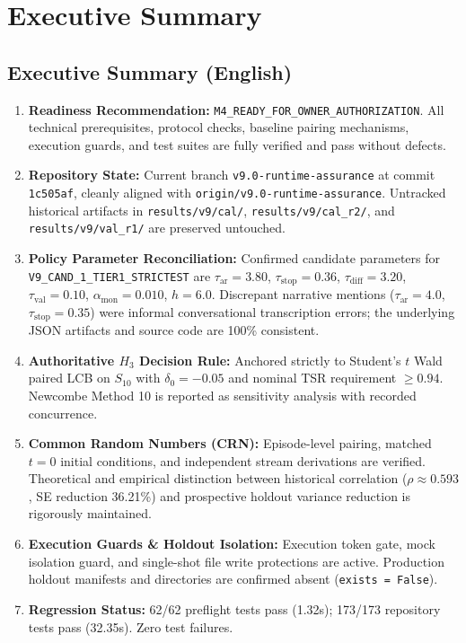 \documentclass[10pt,a4paper]{article}
\begin{document}
\section{Executive Summary}

\subsection{Executive Summary (English)}
\begin{enumerate}
    \item \textbf{Readiness Recommendation:} \texttt{M4\_READY\_FOR\_OWNER\_AUTHORIZATION}. All technical prerequisites, protocol checks, baseline pairing mechanisms, execution guards, and test suites are fully verified and pass without defects.
    \item \textbf{Repository State:} Current branch \texttt{v9.0-runtime-assurance} at commit \texttt{1c505af}, cleanly aligned with \texttt{origin/v9.0-runtime-assurance}. Untracked historical artifacts in \texttt{results/v9/cal/}, \texttt{results/v9/cal\_r2/}, and \texttt{results/v9/val\_r1/} are preserved untouched.
    \item \textbf{Policy Parameter Reconciliation:} Confirmed candidate parameters for \texttt{V9\_CAND\_1\_TIER1\_STRICTEST} are $\tau_{\text{ar}}=3.80$, $\tau_{\text{stop}}=0.36$, $\tau_{\text{diff}}=3.20$, $\tau_{\text{val}}=0.10$, $\alpha_{\text{mon}}=0.010$, $h=6.0$. Discrepant narrative mentions ($\tau_{\text{ar}}=4.0$, $\tau_{\text{stop}}=0.35$) were informal conversational transcription errors; the underlying JSON artifacts and source code are 100\% consistent.
    \item \textbf{Authoritative $H_3$ Decision Rule:} Anchored strictly to Student's $t$ Wald paired LCB on $S_{10}$ with $\delta_0 = -0.05$ and nominal TSR requirement $\ge 0.94$. Newcombe Method 10 is reported as sensitivity analysis with recorded concurrence.
    \item \textbf{Common Random Numbers (CRN):} Episode-level pairing, matched $t=0$ initial conditions, and independent stream derivations are verified. Theoretical and empirical distinction between historical correlation ($\rho \approx 0.593$, SE reduction 36.21\%) and prospective holdout variance reduction is rigorously maintained.
    \item \textbf{Execution Guards \& Holdout Isolation:} Execution token gate, mock isolation guard, and single-shot file write protections are active. Production holdout manifests and directories are confirmed absent (\texttt{exists = False}).
    \item \textbf{Regression Status:} 62/62 preflight tests pass (1.32s); 173/173 repository tests pass (32.35s). Zero test failures.
\end{enumerate}
\end{document}
